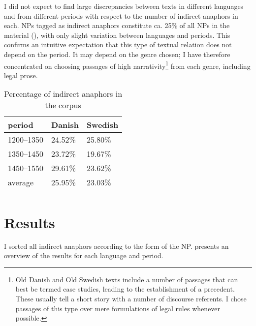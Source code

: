 \documentclass[output=paper]{langsci/langscibook}
\begin{document}
{
I did not expect to find large discrepancies between texts in different languages and from different periods with respect to the number of indirect anaphors in each. NPs tagged as indirect anaphors constitute ca. 25\% of all NPs in the material (), with only slight variation between languages and periods. This confirms an intuitive expectation that this type of textual relation does not depend on the period. It may depend on the genre chosen; I have therefore concentrated on choosing passages of high narrativity\footnote{Old Danish and Old Swedish texts include a number of passages that can best be termed case studies, leading to the establishment of a precedent. These usually tell a short story with a number of discourse referents. I chose passages of this type over mere formulations of legal rules whenever possible.} from each genre, including legal prose.
}

\begin{table}
\begin{tabularx}{\textwidth}{XXl}
\lsptoprule
{\textbf{period}} & {\textbf{Danish}} & {\textbf{Swedish}}\\ 
\midrule
1200--1350	& 24.52\%		& 25.80\% \\ 
1350--1450	& 23.72\%		& 19.67\% \\ 
1450--1550	& 29.61\%		& 23.62\% \\ 
average		& 25.95\%		& 23.03\% \\ 
\lspbottomrule
\end{tabularx}
\caption{Percentage of indirect anaphors in the corpus}\label{6table:2}
\end{table}


\section{Results}\label{6sec:4}

I sorted all indirect anaphors according to the form of the NP.  presents an overview of the results for each language and period.
\end{document}
